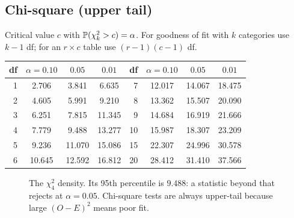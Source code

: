 \subsection{Chi-square (upper tail)}

Critical value $c$ with $\P(\chi^2_k > c)=\alpha$. For goodness of fit with $k$ categories use $k-1$ df; for an $r\times c$ table use $(r-1)(c-1)$ df.

\begin{center}
\small
\begin{tabular}{@{}rccc@{\hspace{2.2em}}rccc@{}}
\toprule
df & $\alpha=0.10$ & $0.05$ & $0.01$ & df & $\alpha=0.10$ & $0.05$ & $0.01$ \\
\midrule
1 & 2.706 & 3.841 & 6.635 & 7 & 12.017 & 14.067 & 18.475 \\
2 & 4.605 & 5.991 & 9.210 & 8 & 13.362 & 15.507 & 20.090 \\
3 & 6.251 & 7.815 & 11.345 & 9 & 14.684 & 16.919 & 21.666 \\
4 & 7.779 & 9.488 & 13.277 & 10 & 15.987 & 18.307 & 23.209 \\
5 & 9.236 & 11.070 & 15.086 & 15 & 22.307 & 24.996 & 30.578 \\
6 & 10.645 & 12.592 & 16.812 & 20 & 28.412 & 31.410 & 37.566 \\
\bottomrule
\end{tabular}
\end{center}

\begin{figure}[H]
\centering
{}
\caption{The $\chi^2_4$ density. Its 95th percentile is $9.488$: a statistic beyond that rejects at $\alpha=0.05$. Chi-square tests are always upper-tail because large $(O-E)^2$ means poor fit.}
\label{fig:appendix-formulas-chisq}
\end{figure}

